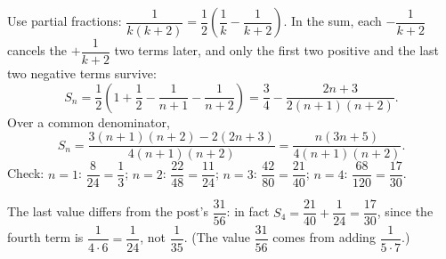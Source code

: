 Use partial fractions: $\dfrac{1}{k(k+2)}=\dfrac12\left(\dfrac1k-\dfrac1{k+2}\right)$. In the sum, each $-\dfrac1{k+2}$ cancels the $+\dfrac1{k+2}$ two terms later, and only the first two positive and the last two negative terms survive:
\[S_n=\dfrac12\left(1+\dfrac12-\dfrac1{n+1}-\dfrac1{n+2}\right)=\dfrac34-\dfrac{2n+3}{2(n+1)(n+2)}.\]
Over a common denominator,
\[S_n=\dfrac{3(n+1)(n+2)-2(2n+3)}{4(n+1)(n+2)}=\boxed{\dfrac{n(3n+5)}{4(n+1)(n+2)}}.\]
Check: $n=1$: $\dfrac{8}{24}=\dfrac13$; $n=2$: $\dfrac{22}{48}=\dfrac{11}{24}$; $n=3$: $\dfrac{42}{80}=\dfrac{21}{40}$; $n=4$: $\dfrac{68}{120}=\dfrac{17}{30}$.

The last value differs from the post's $\dfrac{31}{56}$: in fact $S_4=\dfrac{21}{40}+\dfrac{1}{24}=\dfrac{17}{30}$, since the fourth term is $\dfrac{1}{4\cdot6}=\dfrac1{24}$, not $\dfrac1{35}$. (The value $\dfrac{31}{56}$ comes from adding $\dfrac{1}{5\cdot7}$.)
